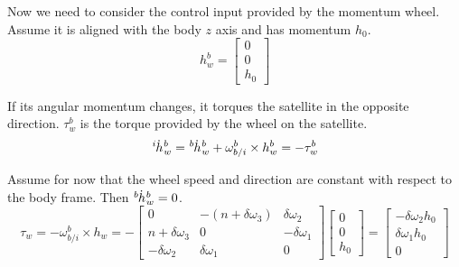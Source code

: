 \documentclass[]{article}
\begin{document}
Now we need to consider the control input provided by the momentum wheel. Assume it is aligned with the body $z$ axis and has momentum $h_0$.
\begin{equation}
	h_w^b = \begin{bmatrix}
		0 \\ 0 \\ h_0
	\end{bmatrix}
\end{equation}

If its angular momentum changes, it torques the satellite in the opposite direction. $\tau_w^b$ is the torque provided by the wheel on the satellite. 
\begin{equation}
	\LeftSuper{i}{\dot{h}}_w^b = \LeftSuper{b}{\dot{h}}_w^b + \omega_{b/i}^b \times h_w^b = -\tau_w^b
\end{equation}

Assume for now that the wheel speed and direction are constant with respect to the body frame. Then $\LeftSuper{b}{\dot{h}}_w^b = 0$.
\begin{equation}
	\tau_w = - \omega_{b/i}^b \times h_w = - \begin{bmatrix}
		0 & -(n + \delta \omega_3) & \delta \omega_2 \\
		n + \delta \omega_3 & 0 & -\delta \omega_1 \\
		-\delta \omega_2 & \delta \omega_1 & 0
	\end{bmatrix} \begin{bmatrix}
	0 \\ 0 \\ h_0
\end{bmatrix} = \begin{bmatrix}
-\delta \omega_2 h_0 \\
\delta \omega_1 h_0 \\
0
\end{bmatrix}
\end{equation}
\end{document}

